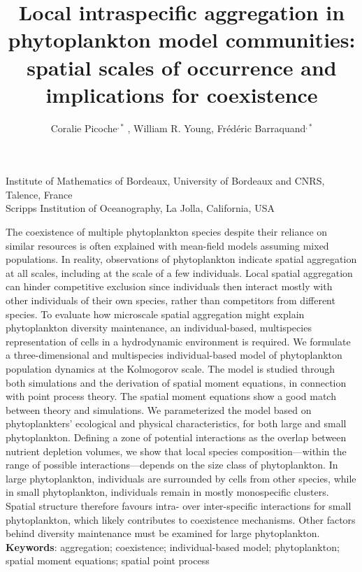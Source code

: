 \documentclass[12pt,english]{article}
\newcommand{\lyxaddress}[1]{
	\par {\raggedright #1
	\vspace{1.4em}
	\noindent\par}
}
\renewenvironment{abstract}
 {\small
  \begin{center}
  \bfseries \abstractname\vspace{-.5em}\vspace{0pt}
  \end{center}
  \list{}{
    \setlength{\leftmargin}{.5cm}%
    \setlength{\rightmargin}{\leftmargin}%
  }%
  \item\relax}
 {\endlist}
\begin{document}
\title{Local intraspecific aggregation in phytoplankton model communities:
spatial scales of occurrence and implications for coexistence}
\author{Coralie Picoche\textonesuperior $^{,*}$ , William R. Young\texttwosuperior ,
Fr\'e{}d\'e{}ric Barraquand\textonesuperior $^{,*}${}}
\maketitle

\thispagestyle{empty}
\vspace{-1cm}

\lyxaddress{}

\lyxaddress{\noindent \begin{center}
\textonesuperior Institute of Mathematics of Bordeaux, University
of Bordeaux and CNRS, Talence, France\\
 \texttwosuperior Scripps Institution of Oceanography, La Jolla, California,
USA 
\par\end{center}}

\onehalfspacing
\linenumbers
\begin{abstract}
The coexistence of multiple phytoplankton species despite their reliance
on similar resources is often explained with mean-field models assuming
mixed populations. In reality, observations of phytoplankton indicate
spatial aggregation at all scales, including at the scale of a few
individuals. Local spatial aggregation can hinder competitive exclusion
since individuals then interact mostly with other individuals of their
own species, rather than competitors from different species. To evaluate
how microscale spatial aggregation might explain phytoplankton diversity
maintenance, an individual-based, multispecies representation of cells
in a hydrodynamic environment is required. We formulate a three-dimensional
and multispecies individual-based model of phytoplankton population
dynamics at the Kolmogorov scale. The model is studied through both
simulations and the derivation of spatial moment equations, in connection
with point process theory. The spatial moment equations show a good
match between theory and simulations. We parameterized the model based
on phytoplankters' ecological and physical characteristics, for both
large and small phytoplankton. Defining a zone of potential interactions
as the overlap between nutrient depletion volumes, we show that local
species composition---within the range of possible interactions---depends
on the size class of phytoplankton. In large phytoplankton, individuals
are surrounded by cells from other species, while in small phytoplankton,
individuals remain in mostly monospecific clusters. Spatial structure
therefore favours intra- over inter-specific interactions for small
phytoplankton, which likely contributes to coexistence mechanisms.
Other factors behind diversity maintenance must be examined for large
phytoplankton.
\end{abstract}
\textbf{Keywords}: aggregation; coexistence; individual-based model;
phytoplankton; spatial moment equations; spatial point process
\end{document}
